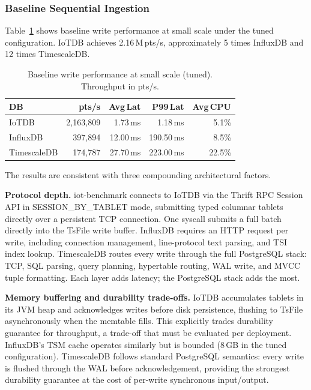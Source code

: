 \subsubsection{Baseline Sequential Ingestion}

Table~\ref{tab:write-baseline} shows baseline write performance at small scale under the tuned
configuration. IoTDB achieves 2.16\,M\,pts/s, approximately 5 times InfluxDB and 12 times
TimescaleDB.

\begin{table}[t]
  \centering
  \caption{Baseline write performance at small scale (tuned). Throughput in pts/s.}
  \label{tab:write-baseline}
  \begin{tabular}{lrrrr}
    \hline
    \textbf{DB} & \textbf{pts/s} & \textbf{Avg\,Lat} & \textbf{P99\,Lat} & \textbf{Avg\,CPU} \\
    \hline
    IoTDB       & 2{,}163{,}809 &  1.73\,ms &   1.18\,ms &  5.1\% \\
    InfluxDB    &   397{,}894   & 12.00\,ms & 190.50\,ms &  8.5\% \\
    TimescaleDB &   174{,}787   & 27.70\,ms & 223.00\,ms & 22.5\% \\
    \hline
  \end{tabular}
\end{table}

The results are consistent with three compounding architectural factors.

\textbf{Protocol depth.} iot-benchmark connects to IoTDB via the Thrift RPC Session API in SESSION\_BY\_TABLET mode,
submitting typed columnar tablets directly over a persistent TCP connection. One
syscall submits a full batch directly into the TsFile write buffer. InfluxDB requires an
HTTP request per write, including connection management, line-protocol text parsing, and
TSI index lookup. TimescaleDB routes every write through the full PostgreSQL stack:
TCP, SQL parsing, query planning, hypertable routing, WAL write, and MVCC tuple formatting.
Each layer adds latency; the PostgreSQL stack adds the most.

\textbf{Memory buffering and durability trade-offs.} IoTDB accumulates tablets in its
JVM heap and acknowledges writes before disk persistence, flushing to TsFile asynchronously
when the memtable fills. This explicitly trades durability guarantee for throughput, a
trade-off that must be evaluated per deployment. InfluxDB's TSM cache operates similarly
but is bounded (8\,GB in the tuned configuration). TimescaleDB follows standard PostgreSQL
semantics: every write is flushed through the WAL before acknowledgement, providing the
strongest durability guarantee at the cost of per-write synchronous input/output.

